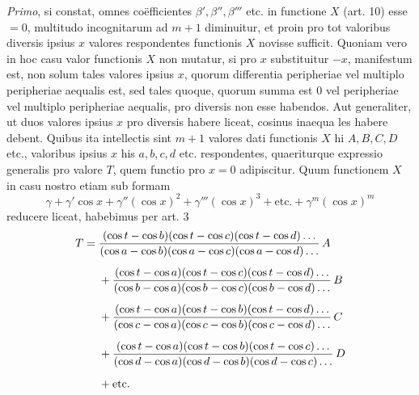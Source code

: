 \textit{Primo}, si constat, omnes coëfficientes \(\beta',\beta'',\beta'''\) etc. in functione \(X\) (art. 10) esse \(=0\), multitudo incognitarum ad \(m+1\) diminuitur, et proin pro tot valoribus diversis ipsius \(x\) valores respondentes functionis \(X\) novisse sufficit. Quoniam vero in hoc casu valor functionis \(X\) non mutatur, si pro \(x\) substituitur \(-x\), manifestum est, non solum tales valores ipsius \(x\), quorum differentia peripheriae vel multiplo peripheriae aequalis est, sed tales quoque, quorum summa est \(0\) vel peripheriae vel multiplo peripheriae aequalis, pro diversis non esse habendos. Aut generaliter, ut duos valores ipsius \(x\) pro diversis habere liceat, cosinus inaequa%
les habere debent. Quibus ita intellectis sint \(m+1\) valores dati functionis \(X\)
hi \(A, B, C, D\) etc., valoribus ipsius \(x\) his \(a, b, c, d\) etc. respondentes, quaeriturque expressio generalis pro valore \(T\), quem functio pro \(x=0\) adipiscitur.
Quum functionem \(X\) in casu nostro etiam sub formam
\[
\gamma+\gamma'\cos x+\gamma''(\cos x)^2+\gamma'''(\cos x)^3+\text{etc.}+\gamma^m(\cos x)^m
\]
reducere liceat, habebimus per art. 3
\[
\begin{aligned}
T={}&\frac{(\cos t-\cos b)(\cos t-\cos c)(\cos t-\cos d)\mathinner{.\,.\,.}}{(\cos a-\cos b)(\cos a-\cos c)(\cos a-\cos d)\mathinner{.\,.\,.}}\,A\\[5pt]
&+\frac{(\cos t-\cos a)(\cos t-\cos c)(\cos t-\cos d)\mathinner{.\,.\,.}}{(\cos b-\cos a)(\cos b-\cos c)(\cos b-\cos d)\mathinner{.\,.\,.}}\,B\\[5pt]
&+\frac{(\cos t-\cos a)(\cos t-\cos b)(\cos t-\cos d)\mathinner{.\,.\,.}}{(\cos c-\cos a)(\cos c-\cos b)(\cos c-\cos d)\mathinner{.\,.\,.}}\,C\\[5pt]
&+\frac{(\cos t-\cos a)(\cos t-\cos b)(\cos t-\cos c)\mathinner{.\,.\,.}}{(\cos d-\cos a)(\cos d-\cos b)(\cos d-\cos c)\mathinner{.\,.\,.}}\,D\\[5pt]
&+\text{etc.}
\end{aligned}
\]

